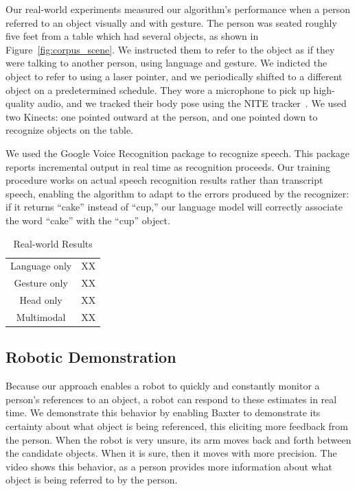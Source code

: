 \documentclass[letterpaper, 10 pt, conference]{ieeeconf}
\begin{document}
Our real-world experiments measured our algorithm's performance when a
person referred to an object visually and with gesture.  The person
was seated roughly five feet from a table which had several objects,
as shown in Figure~\ref{fig:corpus_scene}.  We instructed them to
refer to the object as if they were talking to another person, using
language and gesture.  We indicted the object to refer to using a
laser pointer, and we periodically shifted to a different object on a
predetermined schedule.  They wore a microphone to pick up
high-quality audio, and we tracked their body pose using the NITE
tracker~\citep{openni}.  We used two Kinects: one pointed outward at the
person, and one pointed down to recognize objects on the table.

We used the Google Voice Recognition package to recognize speech.
This package reports incremental output in real time as recognition
proceeds.  Our training procedure works on actual speech recognition
results rather than transcript speech, enabling the algorithm to adapt
to the errors produced by the recognizer: if it returns ``cake''
instead of ``cup,'' our language model will correctly associate the
word ``cake'' with the ``cup'' object.

\begin{table}
\caption{Real-world Results}
\begin{tabular}{cc}
Language only &  XX\\
Gesture only  &  XX\\
Head only     &  XX\\
Multimodal    &  XX\\
\end{tabular}
\end{table}

\subsection{Robotic Demonstration}

Because our approach enables a robot to quickly and constantly monitor
a person's references to an object, a robot can respond to these
estimates in real time.  We demonstrate this behavior by enabling
Baxter to demonstrate its certainty about what object is being
referenced, this eliciting more feedback from the person.  When the
robot is very unsure, its arm moves back and forth between the
candidate objects.  When it is sure, then it moves with more
precision.  The video shows this behavior, as a person provides more
information about what object is being referred to by the person.
\end{document}
